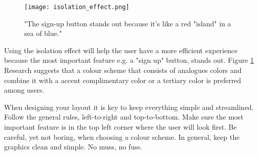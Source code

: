 \begin{figure}[H]
\centering
\texttt{[image: isolation\_effect.png]}
\caption{"The sign-up button stands out because it's like a red "island" in a sea of blue." \cite{ColorMeaning}}
\label{isolationFig}
\end{figure}

Using the isolation effect will help the user have a more efficient experience because the most important feature e.g. a "sign up" button, stands out. \cite{ColorMeaning} Figure \ref{isolationFig}
Research suggests that a colour scheme that consists of analogues colors and combine it with a accent complimentary color or a tertiary color is preferred among users. \cite{ColorMeaning} 

When designing your layout it is key to keep everything simple and streamlined. 
Follow the general rules, left-to-right and top-to-bottom. Make sure the most important feature is in the top left corner where the user will look first.\cite{Sardo}
Be careful, yet not boring, when choosing a colour scheme. In general, keep the graphics clean and simple. No muss, no fuss. 